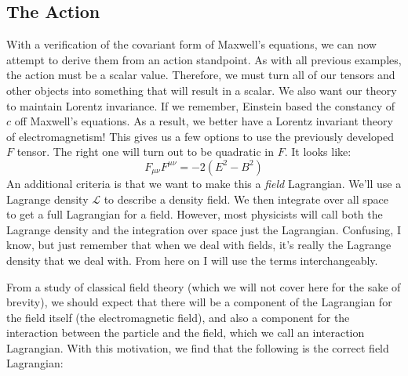 \subsection{The Action}
With a verification of the covariant form of Maxwell's equations, we can now attempt to derive them from an action standpoint. As with all previous examples, the action must be a scalar value. Therefore, we must turn all of our tensors and other objects into something that will result in a scalar. We also want our theory to maintain Lorentz invariance. If we remember, Einstein based the constancy of $c$ off Maxwell's equations. As a result, we better have a Lorentz invariant theory of electromagnetism! This gives us a few options to use the previously developed $F$ tensor. The right one will turn out to be quadratic in $F$. It looks like:
$$F_{\mu\nu}F^{\mu\nu}=-2(E^2-B^2)$$
An additional criteria is that we want to make this a \textit{field} Lagrangian. We'll use a Lagrange density $\mathcal{L}$ to describe a density field. We then integrate over all space to get a full \gls{Lagrangian} for a field. However, most physicists will call both the Lagrange density and the integration over space just the \gls{Lagrangian}. Confusing, I know, but just remember that when we deal with fields, it's really the Lagrange density that we deal with. From here on I will use the terms interchangeably.

From a study of classical field theory (which we will not cover here for the sake of brevity), we should expect that there will be a component of the \gls{Lagrangian} for the field itself (the electromagnetic field), and also a component for the interaction between the particle and the field, which we call an interaction \gls{Lagrangian}. With this motivation, we find that the following is the correct field \gls{Lagrangian}:

